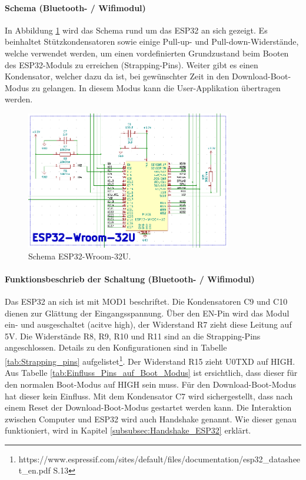 \paragraph{Schema (Bluetooth- / Wifimodul)}\mbox{}

In Abbildung \ref{fig:Schema_ESP32} wird das Schema rund um das ESP32 an sich gezeigt. Es beinhaltet Stützkondensatoren sowie einige Pull-up- und Pull-down-Widerstände, welche verwendet werden, um einen vordefinierten Grundzustand beim Booten des ESP32-Moduls zu erreichen (Strapping-Pins). Weiter gibt es einen Kondensator, welcher dazu da ist, bei gewünschter Zeit in den Download-Boot-Modus zu gelangen. In diesem Modus kann die User-Applikation übertragen werden.

\begin{figure}[H]
	\centering
	\includegraphics[width=0.8\textwidth]{graphics/Schema_ESP32}
	\caption{Schema ESP32-Wroom-32U.}
	\label{fig:Schema_ESP32}
\end{figure}

\paragraph{Funktionsbeschrieb der Schaltung (Bluetooth- / Wifimodul)}\mbox{}

Das ESP32 an sich ist mit MOD1 beschriftet. Die Kondensatoren C9 und C10 dienen zur Glättung der Eingangsspannung. Über den EN-Pin wird das Modul ein- und ausgeschaltet (acitve high), der Widerstand R7 zieht diese Leitung auf 5V. Die Widerstände R8, R9, R10 und R11 sind an die Strapping-Pins angeschlossen.
Details zu den Konfigurationen sind in Tabelle \ref{tab:Strapping_pins} aufgelistet\footnote{https://www.espressif.com/sites/default/files/documentation/esp32\_datasheet\_en.pdf S.13}. Der Widerstand R15 zieht U0TXD auf HIGH. Aus Tabelle \ref{tab:Einfluss_Pins_auf_Boot_Modus} ist ersichtlich, dass dieser für den normalen Boot-Modus auf HIGH sein muss. Für den Download-Boot-Modus hat dieser kein Einfluss. Mit dem Kondensator C7 wird sichergestellt, dass nach einem Reset der Download-Boot-Modus gestartet werden kann. Die Interaktion zwischen Computer und ESP32 wird auch Handshake genannt. Wie dieser genau funktioniert, wird in Kapitel \ref{subsubsec:Handshake_ESP32} erklärt.

